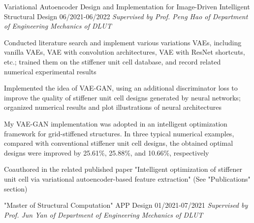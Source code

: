 \begin{cventries2}
{\begin{cvitems}
      \end{cvitems}
    }
    \cventrynew
    {Variational Autoencoder Design and Implementation for Image-Driven Intelligent Structural Design} %
    {06/2021-06/2022} %
    {\textnormal{\textit{Supervised by Prof. Peng Hao of Department of Engineering Mechanics of DLUT}
    }}
    {
      \begin{cvitems} %
        \item Conducted literature search and implement various variations VAEs, including vanilla VAEs, VAE with convolution architectures, VAE with ResNet shortcuts, etc.; trained them on the stiffener unit cell database, and record related numerical experimental results
		    \item Implemented the idea of VAE-GAN, using an additional discriminator loss to improve the quality of stiffener unit cell designs generated by neural networks; organized numerical results and plot illustrations of neural architectures
		    \item My VAE-GAN implementation was adopted in an intelligent optimization framework for grid-stiffened structures. In three typical numerical examples, compared with conventional stiffener unit cell designs, the obtained optimal designs were improved by 25.61\%, 25.88\%, and 10.66\%, respectively 
        \item Coauthored in the related published paper "Intelligent optimization of stiffener unit cell via variational autoencoder-based feature extraction" (See "Publications" section)
      \end{cvitems}
    } 
    \cventrynew
    {"Master of Structural Computation" APP Design} %
    {01/2021-07/2021} %
    {\textnormal{\textit{Supervised by Prof. Jun Yan of Department of Engineering Mechanics of DLUT}
    }}
    {
      \begin{cvitems} %

\end{cvitems}}
\end{cventries2}

